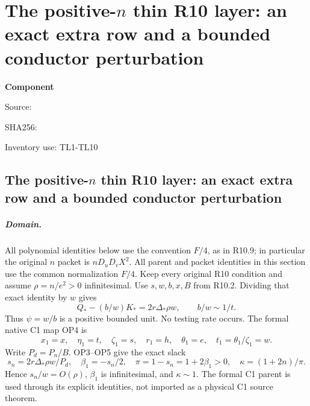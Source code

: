 \chapter{The positive-$n$ thin R10 layer: an exact extra row and a bounded conductor perturbation}
\label{component:pef37475d831e}
\noindent\textbf{Component }\par
{\small\noindent Source: \par}
{\small\noindent SHA256: \par}
{\small\noindent Inventory use: TL1-TL10\par}
\medskip
\section{The positive-$n$ thin R10 layer: an exact extra row and a bounded conductor perturbation}

\paragraph{Domain.}
All polynomial identities below use the convention $F/4$, as in
R10.9; in particular the original $n$ packet is $nD_uD_vX^2$.
All parent and packet identities in this section use the common normalization $F/4$.
Keep every original R10 condition and assume
$\rho=n/e^2>0$ infinitesimal. Use $s,w,b,x,B$ from R10.2.
Dividing that exact identity by $w$ gives
\[
 Q_*-(b/w)K_*=2r\Delta_*\rho w,
 \qquad b/w\sim1/t.
\tag{TL1}
\]
Thus $\psi=w/b$ is a positive bounded unit. No testing rate occurs.
The formal native C1 map OP4 is
\[
 x_1=x,\quad\eta_1=t,\quad\zeta_1=s,\quad r_1=h,\quad
 \theta_1=e,\quad t_1=\theta_1/\zeta_1=w.
\]
Write $P_d=P_n/B$. OP3--OP5 give the exact slack
\[
 s_n=2r\Delta_*\rho w/P_d,\quad
 \beta_1=-s_n/2,\quad \pi=1-s_n=1+2\beta_1>0,\quad
 \kappa=(1+2n)/\pi.
\tag{TL2}
\]
Hence $s_n/w=O(\rho)$, $\beta_1$ is infinitesimal, and
$\kappa\sim1$. The formal C1 parent is used through its explicit
identities, not imported as a physical C1 source theorem.

